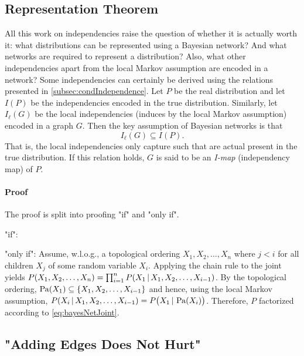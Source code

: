		\subsection{Representation Theorem}
			All this work on independencies raise the question of whether it is actually worth it: what distributions can be represented using a Bayesian network? And what networks are required to represent a distribution? Also, what other independencies apart from the local Markov assumption are encoded in a network? Some independencies can certainly be derived using the relations presented in \autoref{subsec:condIndependence}. Let \(P\) be the real distribution and let \( I(P) \) be the independencies encoded in the true distribution. Similarly, let \( I_\ell(G) \) be the local independencies (induces by the local Markov assumption) encoded in a graph \(G\). Then the key assumption of Bayesian networks is that
			\begin{equation}
				I_\ell(G) \subseteq I(P).
			\end{equation}
			That is, the local independencies only capture such that are actual present in the true distribution. If this relation holds, \(G\) is said to be an \emph{I-map} (independency map) of \(P\).


			\paragraph{Proof}
				The proof is split into proofing "if" and "only if".

				"if": 

				"only if": Assume, w.l.o.g., a topological ordering \( X_1, X_2, \dots, X_n \) where \(j < i\) for all children \(X_j\) of some random variable \(X_i\). Applying the chain rule to the joint yields \( P(X_1, X_2, \dots, X_n) = \prod_{i = 1}^{n} P(X_1 \,\vert\, X_1, X_2, \dots, X_{i - 1}) \). By the topological ordering, \( \operatorname{Pa}(X_1) \subseteq \{ X_1, X_2, \dots, X_{i - 1} \} \) and hence, using the local Markov assumption, \( P(X_i \,\vert\, X_1, X_2, \dots, X_{i - 1}) = P\bigl(X_1 \,\vert\, \operatorname{Pa}(X_i) \bigr) \). Therefore, \(P\) factorized according to \eqref{eq:bayesNetJoint}.

		\subsection{"Adding Edges Does Not Hurt"}

